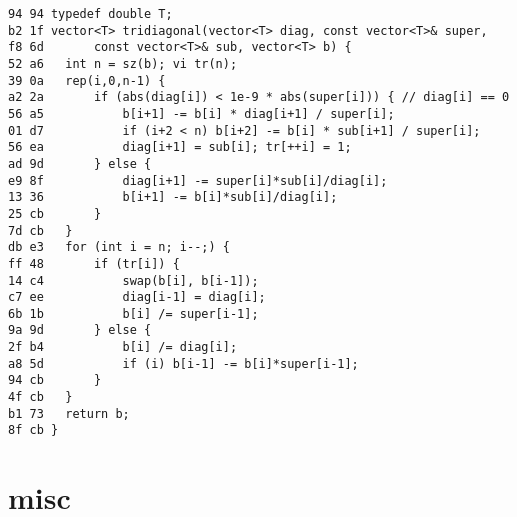 \documentclass[11pt, a4paper, twoside]{article}
\begin{document}
\begin{lstlisting}
94 94 typedef double T;
b2 1f vector<T> tridiagonal(vector<T> diag, const vector<T>& super,
f8 6d 		const vector<T>& sub, vector<T> b) {
52 a6 	int n = sz(b); vi tr(n);
39 0a 	rep(i,0,n-1) {
a2 2a 		if (abs(diag[i]) < 1e-9 * abs(super[i])) { // diag[i] == 0
56 a5 			b[i+1] -= b[i] * diag[i+1] / super[i];
01 d7 			if (i+2 < n) b[i+2] -= b[i] * sub[i+1] / super[i];
56 ea 			diag[i+1] = sub[i]; tr[++i] = 1;
ad 9d 		} else {
e9 8f 			diag[i+1] -= super[i]*sub[i]/diag[i];
13 36 			b[i+1] -= b[i]*sub[i]/diag[i];
25 cb 		}
7d cb 	}
db e3 	for (int i = n; i--;) {
ff 48 		if (tr[i]) {
14 c4 			swap(b[i], b[i-1]);
c7 ee 			diag[i-1] = diag[i];
6b 1b 			b[i] /= super[i-1];
9a 9d 		} else {
2f b4 			b[i] /= diag[i];
a8 5d 			if (i) b[i-1] -= b[i]*super[i-1];
94 cb 		}
4f cb 	}
b1 73 	return b;
8f cb }
\end{lstlisting}



%
%

\section{misc}
\end{document}
